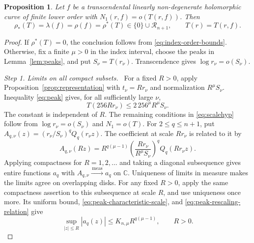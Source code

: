 \documentclass[11pt,letterpaper,reqno]{amsart}
\newtheorem{prop}[thm]{Proposition}
\theoremstyle{remark}
\numberwithin{equation}{section}
\newcommand{\C}{\mathbb C}
\newcommand{\convmeas}{\xrightarrow{\,\mathrm{meas}\,}}
\newcommand{\Gn}{\mathcal R_{n+1}}
\newcommand{\step}[1]{\medskip\noindent\emph{#1}\ }
\begin{document}
\begin{prop}\label{prop:indices}
Let $f$ be a transcendental linearly non-degenerate holomorphic curve of
finite lower order with $N_1(r,f)=o(T(r,f))$. Then
\begin{equation}\label{eq:indices-collapse}
 \rho_*(T)=\lambda(f)=\rho(f)=\rho^*(T)\in\{0\}\cup\Gn,
 \qquad T(r)=T(r,f).
\end{equation}
\end{prop}
\begin{proof}
If $\rho^*(T)=0$, the conclusion follows from \eqref{eq:index-order-bounds}.
Otherwise, fix a finite $\mu>0$ in the index interval, choose the peaks in
Lemma~\ref{lem:peaks}, and put $S_\nu=T(r_\nu)$. Transcendence gives
$\log r_\nu=o(S_\nu)$.

\step{Step 1. Limits on all compact subsets.}
For a fixed $R>0$, apply Proposition~\ref{prop:representation} with
$t_\nu=Rr_\nu$ and normalization $R^\mu S_\nu$. Inequality
\eqref{eq:peak} gives, for all sufficiently large $\nu$,
\begin{equation}\label{eq:peak-characteristic-scale}
 T(256Rr_\nu)\le2\,256^\mu R^\mu S_\nu.
\end{equation}
The constant is independent of $R$. The remaining conditions in
\eqref{eq:scalehyp} follow from $\log r_\nu=o(S_\nu)$ and
$N_1=o(T)$. For $2\le q\le n+1$, put
$A_{q,\nu}(z)=(r_\nu/S_\nu)^qQ_q(r_\nu z)$. The coefficient at scale
$Rr_\nu$ is related to it by
\begin{equation}\label{eq:peak-rescaling-relation}
 A_{q,\nu}(Rz)=R^{q(\mu-1)}
     \left(\frac{Rr_\nu}{R^\mu S_\nu}\right)^qQ_q(Rr_\nu z).
\end{equation}
Applying compactness for $R=1,2,\ldots$ and taking a diagonal subsequence
gives entire functions $a_q$ with $A_{q,\nu}\convmeas a_q$ on $\C$.
Uniqueness of limits in measure makes the limits agree on overlapping
disks. For any fixed $R>0$, apply the same compactness assertion to this
subsequence at scale $R$, and use uniqueness once more. Its uniform bound,
\eqref{eq:peak-characteristic-scale}, and
\eqref{eq:peak-rescaling-relation} give
\begin{equation}\label{eq:peak-coefficient-bound}
 \sup_{|z|\le R}|a_q(z)|\le K_{n,\mu}R^{q(\mu-1)},
 \qquad R>0.
\end{equation}


\end{proof}
\end{document}
